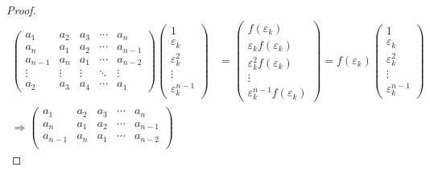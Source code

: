 \documentclass[class=linearalgebra,crop=false]{standalone}
\begin{document}
\begin{proof}
    \begingroup
    \allowdisplaybreaks
    \begin{align*}
        \begin{pmatrix}
            a_{1}   & a_{2}  & a_{3}  & \cdots & a_{n}   \\
            a_{n}   & a_{1}  & a_{2}  & \cdots & a_{n-1} \\
            a_{n-1} & a_{n}  & a_{1}  & \cdots & a_{n-2} \\
            \vdots  & \vdots & \vdots & \ddots & \vdots  \\
            a_{2}   & a_{3}  & a_{4}  & \cdots & a_{1}
        \end{pmatrix}
        \begin{pmatrix}
            1                   \\
            \varepsilon_{k}     \\
            \varepsilon_{k}^{2} \\
            \vdots              \\
            \varepsilon_{k}^{n-1}
        \end{pmatrix}
         & =
        \begin{pmatrix}
            f(\varepsilon_{k})                    \\
            \varepsilon_{k}f(\varepsilon_{k})     \\
            \varepsilon_{k}^{2}f(\varepsilon_{k}) \\
            \vdots                                \\
            \varepsilon_{k}^{n-1}f(\varepsilon_{k})
        \end{pmatrix}
        = f(\varepsilon_{k})
        \begin{pmatrix}
            1                   \\
            \varepsilon_{k}     \\
            \varepsilon_{k}^{2} \\
            \vdots              \\
            \varepsilon_{k}^{n-1}
        \end{pmatrix}                   \\
        \Rightarrow
        \begin{pmatrix}
            a_{1}   & a_{2}  & a_{3}  & \cdots & a_{n}   \\
            a_{n}   & a_{1}  & a_{2}  & \cdots & a_{n-1} \\
            a_{n-1} & a_{n}  & a_{1}  & \cdots & a_{n-2} \\

\end{pmatrix}
\end{align*}
\end{proof}
\end{document}
